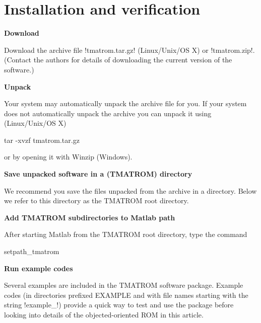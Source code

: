 \documentclass[12pt,letterpaper,final]{article}
\newcommand{\techheading}[1]{%
    \par\vspace{-0.3\parskip}\noindent\hspace{-1cm}\textbf{#1}%
    \par\vspace{-0.5\parskip}\noindent\nopagebreak\ignorespaces}
\begin{document}

\clearpage

\newpage
\section{Installation  and verification}
\vspace{-0.2in}

\techheading{Download }
Download the archive file !tmatrom.tar.gz! (Linux/Unix/OS X)
or !tmatrom.zip!. \\ (Contact the authors for  details of   downloading  the current version of the software.)

\techheading{Unpack}
Your system may automatically unpack the archive file for you.
If your system does not automatically unpack the archive you can unpack it
using (Linux/Unix/OS X)
\begin{unix}
tar -xvzf tmatrom.tar.gz
\end{unix}
or by opening it with Winzip (Windows).

\techheading{Save unpacked software in a (TMATROM) directory}
We recommend you save the files unpacked from the archive in a directory.
Below we refer to this directory as the TMATROM root directory.


\techheading{Add TMATROM subdirectories to Matlab path}
After starting Matlab from the TMATROM root directory, type the command 
\begin{matlab}
setpath_tmatrom
\end{matlab}

\techheading{Run example codes}
Several examples are included in the TMATROM software package. Example codes 
(in directories prefixed EXAMPLE and with file names starting with the string !example_!)  
provide a quick way to test and use 
the package before looking into details of the  objected-oriented ROM  in this article.
\end{document}
